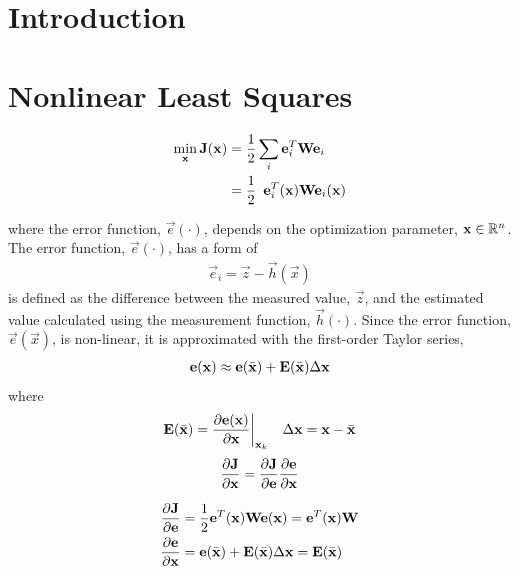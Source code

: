 \documentclass[11pt]{article}
\begin{document}
\section{Introduction}


\section{Nonlinear Least Squares}

\begin{align}
  \min_{\mathbf{x}} \mathbf{J}(\mathbf{x})
    &=
      \dfrac{1}{2}
      \sum_{i}
      \mathbf{e}_{i}^{T} \mathbf{W} \mathbf{e}_{i} \\
    &=
      \dfrac{1}{2} \enspace
      \mathbf{e}_{i}^{T}(\mathbf{x})
      \mathbf{W}
      \mathbf{e}_{i}(\mathbf{x})
\end{align}

where the error function, $\Vec{e}(\cdot)$, depends on the optimization
parameter, $\mathbf{x} \in \mathbb{R}^{n}$. The error function,
$\Vec{e}(\cdot)$, has a form of
\begin{align}
  \Vec{e}_{i} =
    \Vec{z} - \Vec{h}(\Vec{x})
\end{align}
is defined as the difference between the measured value, $\Vec{z}$, and
the estimated value calculated using the measurement function,
$\Vec{h}(\cdot)$.  Since the error function, $\Vec{e}(\Vec{x})$, is
non-linear, it is approximated with the first-order Taylor series,
\begin{align}
  \mathbf{e}(\mathbf{x})
    \approx
      \mathbf{e}(\bar{\mathbf{x}}) +
      \mathbf{E}(\bar{\mathbf{x}}) \Delta\mathbf{x}
\end{align}
where
\begin{align}
  \mathbf{E}(\bar{\mathbf{x}}) =
    \dfrac{\partial\mathbf{e}(\mathbf{x})}{\partial\mathbf{x}}
    \bigg\rvert_{\mathbf{x}_{k}}
\enspace \enspace
  \Delta{\mathbf{x}} = \mathbf{x} - \bar{\mathbf{x}}
\end{align}
\begin{align}
  \dfrac{\partial{\mathbf{J}}}{\partial{\mathbf{x}}} =
    \dfrac{\partial{\mathbf{J}}}{\partial{\mathbf{e}}}
    \dfrac{\partial{\mathbf{e}}}{\partial{\mathbf{x}}}
\end{align}

\begin{align}
  \dfrac{\partial{\mathbf{J}}}{\partial{\mathbf{e}}} &=
    \dfrac{1}{2} \mathbf{e}^{T}(\mathbf{x}) \mathbf{W} \mathbf{e}(\mathbf{x}) =
    \mathbf{e}^{T}(\mathbf{x}) \mathbf{W} \\
  \dfrac{\partial{\mathbf{e}}}{\partial{\mathbf{x}}} &=
    \mathbf{e}(\bar{\mathbf{x}}) +
    \mathbf{E}(\bar{\mathbf{x}}) \Delta\mathbf{x} =
    \mathbf{E}(\bar{\mathbf{x}})
\end{align}
\end{document}
